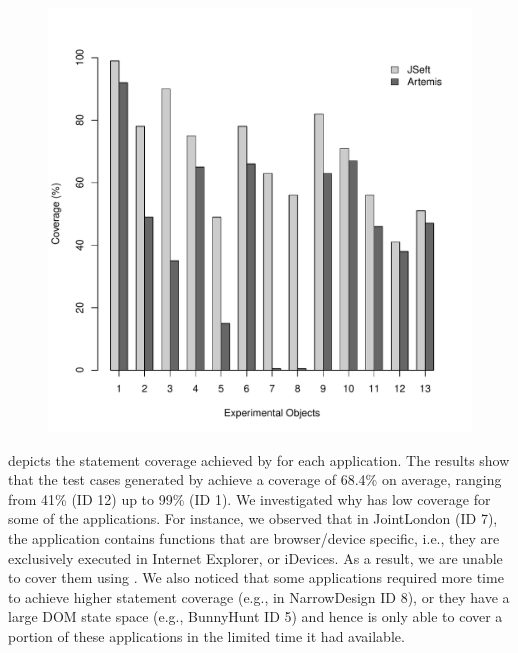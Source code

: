 \begin{figure}[!t]
  \centering
  \includegraphics[width=1\hsize]{r-scripts/barplot_coverage}
  \vspace{-0.1in} 
  \vspace{-0.25in} 
  \label{Fig:coverage-graph}
\end{figure}


 depicts the statement coverage achieved by \tool for each application. The results show that the test cases generated by \tool achieve a coverage of 68.4\% on average, ranging from 41\% (ID 12) up to 99\% (ID 1).
We investigated why \tool has low coverage for some of the applications. For instance, we observed that in JointLondon (ID 7), the application contains \javascript functions that are browser/device specific, i.e., they are exclusively executed in Internet Explorer, or iDevices. As a result, we are unable to cover them using \tool. 
We also noticed that some applications required more time to achieve higher statement coverage (e.g., in NarrowDesign ID 8), or they have a large DOM state space (e.g., BunnyHunt ID 5) and hence \tool is only able to cover a portion of these applications in the limited time it had available.

